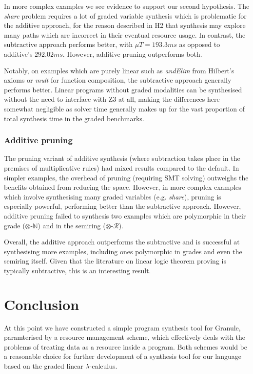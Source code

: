 In more complex examples we see evidence to support our second hypothesis. The
\textit{share} problem requires a lot of graded variable synthesis which is
problematic for the additive approach, for the reason described in H2 that synthesis 
may explore many paths which are incorrect in their eventual resource usage. In
contrast, the subtractive approach performs better, with $\mu{T} =
193.3\textit{ms}$ as opposed to additive's $292.02\textit{ms}$. However,
additive pruning outperforms both.

Notably, on examples which are purely linear such as \textit{andElim} from
Hilbert's axioms or \textit{mult} for function composition, the subtractive
approach generally performs better. Linear programs without graded modalities
can be synthesised without the need to interface with Z3 at all, making the
differences here somewhat negligible as solver time generally makes up for the
vast proportion of total synthesis time in the graded benchmarks.

\subsubsection{Additive pruning}
The pruning variant of additive synthesis (where subtraction
takes place in the premises of multiplicative rules) had mixed results
compared to the default. In simpler examples, the overhead of pruning
(requiring SMT solving) outweighs
the benefits obtained from reducing the space. However, in more
complex examples which involve synthesising many graded variables (e.g. \textit{share}), pruning is
especially powerful, performing better than the subtractive
approach. However, additive pruning failed to synthesis two
 examples which are polymorphic in their grade
 ($\otimes$-$\mathbb{N}$) and in the semiring ($\otimes$-$\mathcal{R}$).


Overall, the additive approach outperforms the subtractive and is successful at
synthesising more examples, including ones polymorphic in grades and even the
semiring itself. Given that the literature on linear logic theorem proving is
typically subtractive, this is an interesting result. 

\section{Conclusion}
\label{sec:linear-base-conclusion}

At this point we have constructed a simple program synthesis tool for Granule,
paramterised by a resource management scheme, which effectively deals with the
problems of treating data as a resource inside a program. Both schemes would be
a reasonable choice for further development of a synthesis tool for our language
based on the graded linear $\lambda$-calculus.   

